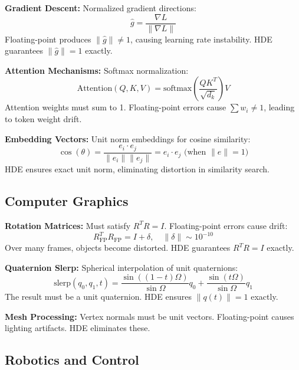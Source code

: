 \documentclass{article}
\begin{document}
\textbf{Gradient Descent:} Normalized gradient directions:
\begin{equation}
\hat{g} = \frac{\nabla L}{\|\nabla L\|}
\end{equation}
Floating-point produces $\|\hat{g}\| \neq 1$, causing learning rate instability. HDE guarantees $\|\hat{g}\| = 1$ exactly.

\textbf{Attention Mechanisms:} Softmax normalization:
\begin{equation}
\text{Attention}(Q, K, V) = \text{softmax}\left(\frac{QK^T}{\sqrt{d_k}}\right)V
\end{equation}
Attention weights must sum to 1. Floating-point errors cause $\sum w_i \neq 1$, leading to token weight drift.

\textbf{Embedding Vectors:} Unit norm embeddings for cosine similarity:
\begin{equation}
\cos(\theta) = \frac{e_i \cdot e_j}{\|e_i\| \|e_j\|} = e_i \cdot e_j \text{ (when }\|e\| = 1\text{)}
\end{equation}
HDE ensures exact unit norm, eliminating distortion in similarity search.

\subsection{Computer Graphics}

\textbf{Rotation Matrices:} Must satisfy $R^T R = I$. Floating-point errors cause drift:
\begin{equation}
R_{\text{FP}}^T R_{\text{FP}} = I + \delta, \quad \|\delta\| \sim 10^{-10}
\end{equation}
Over many frames, objects become distorted. HDE guarantees $R^T R = I$ exactly.

\textbf{Quaternion Slerp:} Spherical interpolation of unit quaternions:
\begin{equation}
\text{slerp}(q_0, q_1, t) = \frac{\sin((1-t)\Omega)}{\sin\Omega} q_0 + \frac{\sin(t\Omega)}{\sin\Omega} q_1
\end{equation}
The result must be a unit quaternion. HDE ensures $\|q(t)\| = 1$ exactly.

\textbf{Mesh Processing:} Vertex normals must be unit vectors. Floating-point causes lighting artifacts. HDE eliminates these.

\subsection{Robotics and Control}
\end{document}
